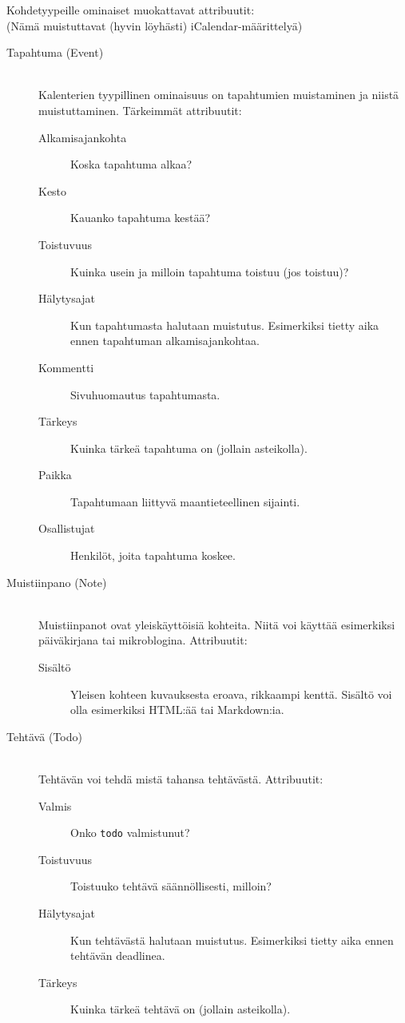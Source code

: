 \documentclass[a4paper,12pt]{report}
\begin{document}
\begin{description}
      Kohdetyypeille ominaiset muokattavat attribuutit:
      \\(Nämä muistuttavat (hyvin löyhästi) iCalendar-määrittelyä)
      \begin{description}
         \item[Tapahtuma (Event)] \hfill\\
            Kalenterien tyypillinen ominaisuus on tapahtumien muistaminen ja
            niistä muistuttaminen. Tärkeimmät attribuutit:
            \begin{description}
               \item[Alkamisajankohta]  Koska tapahtuma alkaa?
               \item[Kesto]  Kauanko tapahtuma kestää?
               \item[Toistuvuus] Kuinka usein ja milloin tapahtuma toistuu (jos
                  toistuu)?
               \item[Hälytysajat]  Kun tapahtumasta halutaan muistutus. Esimerkiksi
                  tietty aika ennen tapahtuman alkamisajankohtaa.
               \item[Kommentti]  Sivuhuomautus tapahtumasta.
               \item[Tärkeys]  Kuinka tärkeä tapahtuma on (jollain asteikolla).
               \item[Paikka]  Tapahtumaan liittyvä maantieteellinen sijainti.
               \item[Osallistujat] Henkilöt, joita tapahtuma koskee.
            \end{description}

         \item[Muistiinpano (Note)] \hfill\\
            Muistiinpanot ovat yleiskäyttöisiä
            kohteita.  Niitä voi käyttää esimerkiksi päiväkirjana tai
            mikroblogina. Attribuutit:
            \begin{description}
               \item[Sisältö] Yleisen kohteen kuvauksesta eroava, rikkaampi
                  kenttä. Sisältö voi olla esimerkiksi HTML:ää tai Markdown:ia.
            \end{description}

         \item[Tehtävä (Todo)] \hfill\\
            Tehtävän voi tehdä mistä tahansa tehtävästä. Attribuutit:
            \begin{description}
               \item[Valmis] Onko \texttt{todo} valmistunut?
               \item[Toistuvuus] Toistuuko tehtävä säännöllisesti, milloin?
               \item[Hälytysajat]  Kun tehtävästä halutaan muistutus. Esimerkiksi
                  tietty aika ennen tehtävän deadlinea.
               \item[Tärkeys]  Kuinka tärkeä tehtävä on (jollain asteikolla).
            \end{description}
      \end{description}


\end{description}
\end{document}

